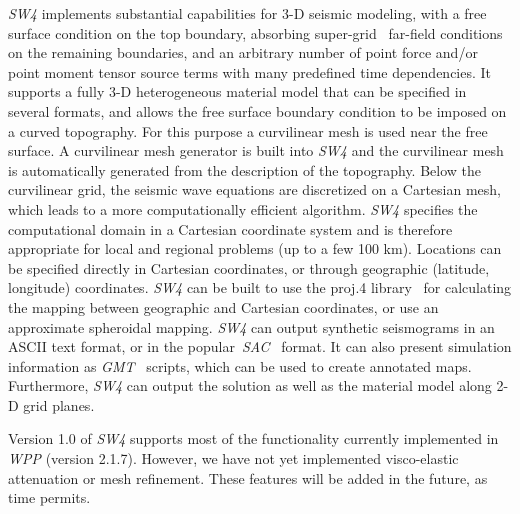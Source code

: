 \documentclass[11pt]{report}
\begin{document}
\emph{SW4} implements substantial capabilities for 3-D seismic modeling, with a free surface
condition on the top boundary, absorbing super-grid~\cite{PetSjo-13} far-field conditions on the
remaining boundaries, and an arbitrary number of point force and/or point moment tensor source terms
with many predefined time dependencies. It supports a fully 3-D heterogeneous material model that
can be specified in several formats, and allows the free surface boundary condition to be imposed on
a curved topography. For this purpose a curvilinear mesh is used near the free surface. A
curvilinear mesh generator is built into \emph{SW4} and the curvilinear mesh is automatically
generated from the description of the topography. Below the curvilinear grid, the seismic wave
equations are discretized on a Cartesian mesh, which leads to a more computationally efficient
algorithm. \emph{SW4} specifies the computational domain in a Cartesian coordinate system and is
therefore appropriate for local and regional problems (up to a few 100 km). Locations can be
specified directly in Cartesian coordinates, or through geographic (latitude, longitude)
coordinates. \emph{SW4} can be built to use the proj.4 library~\cite{Proj4} for calculating the
mapping between geographic and Cartesian coordinates, or use an approximate spheroidal
mapping. \emph{SW4} can output synthetic seismograms in an ASCII text format, or in the
popular~\emph{SAC}~\cite{Goldstein-et-al} format. It can also present simulation information as
\emph{GMT}~\cite{WesselSmithGMT} scripts, which can be used to create annotated maps. Furthermore,
\emph{SW4} can output the solution as well as the material model along 2-D grid planes.

Version 1.0 of \emph{SW4} supports most of the functionality currently implemented in \emph{WPP}
(version 2.1.7). However, we have not yet implemented visco-elastic attenuation or mesh
refinement. These features will be added in the future, as time permits.

\end{document}

